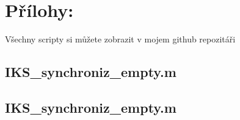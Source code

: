 \documentclass[10pt, a4paper]{article}%
\begin{document}
\section*{\Large Přílohy:}
Všechny scripty si můžete zobrazit v mojem github repozitáři \href{}{}

\subsection*{IKS_synchroniz_empty.m}


\subsection*{IKS_synchroniz_empty.m}

\end{document}
